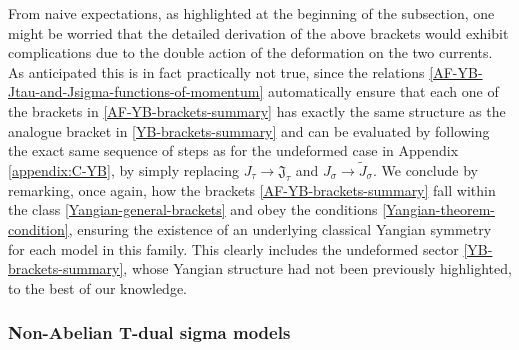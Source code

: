 \documentclass[12pt]{article}
\numberwithin{equation}{section}
\begin{document}
From naive expectations, as highlighted at the beginning of the subsection, one might be worried that the detailed derivation of the above brackets would exhibit complications due to the double action of the deformation on the two currents. As anticipated this is in fact practically not true, since the relations \eqref{AF-YB-Jtau-and-Jsigma-functions-of-momentum} automatically ensure that each one of the brackets in \eqref{AF-YB-brackets-summary} has exactly the same structure as the analogue bracket in \eqref{YB-brackets-summary} and can be evaluated by following the exact same sequence of steps as for the undeformed case in Appendix \ref{appendix:C-YB}, by simply replacing $J_{\tau} \rightarrow\mathfrak{J}_{\tau}$ and $J_{\sigma}\rightarrow \tilde{J}_{\sigma}$. We conclude by remarking, once again, how the brackets \eqref{AF-YB-brackets-summary} fall within the class \eqref{Yangian-general-brackets} and obey the conditions \eqref{Yangian-theorem-condition}, ensuring the existence of an underlying classical Yangian symmetry for each model in this family. This clearly includes the undeformed sector \eqref{YB-brackets-summary}, whose Yangian structure had not been previously highlighted, to the best of our knowledge.



\subsubsection{Non-Abelian T-dual sigma models}\label{subsubsec:TD}
\end{document}
